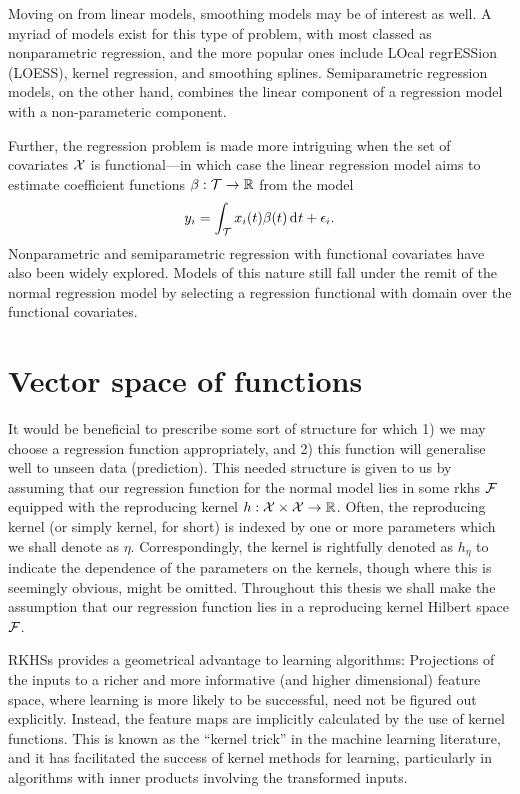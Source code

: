 \documentclass[a4paper,showframe,11pt]{report}
\begin{document}
Moving on from linear models, smoothing models may be of interest as well.
A myriad of models exist for this type of problem, with most classed as nonparametric regression, and the more popular ones include LOcal regrESSion (LOESS), kernel regression, and smoothing splines.
Semiparametric regression models, on the other hand, combines the linear component of a regression model with a non-parameteric component.

Further, the regression problem is made more intriguing when the set of covariates ${\mathcal X}$ is functional---in which case the linear regression model aims to estimate coefficient functions $\beta:{\mathcal T} \to \mathbb{R}$ from the model
\[
  y_i = \int_{\mathcal T} x_i(t)\beta(t) \operatorname{d}\hspace{0.5pt}\! t + \epsilon_i.
\]
Nonparametric and semiparametric regression with functional covariates have also been widely explored.
Models of this nature still fall under the remit of the normal regression model by selecting a regression functional with domain over the functional covariates.

\section{Vector space of functions}

It would be beneficial to prescribe some sort of structure for which 1) we may choose a regression function appropriately, and 2) this function will generalise well to unseen data (prediction). 
This needed structure is given to us by assuming that our regression function for the normal model lies in some \gls*{rkhs} ${\mathcal F}$ equipped with the reproducing kernel $h:{\mathcal X} \times {\mathcal X} \to \mathbb{R}$.
Often, the reproducing kernel (or simply kernel, for short) is indexed by one or more parameters which we shall denote as $\eta$.
Correspondingly, the kernel is rightfully denoted as $h_\eta$ to indicate the dependence of the parameters on the kernels, though where this is seemingly obvious, might be omitted.
Throughout this thesis we shall make the assumption that our regression function lies in a reproducing kernel Hilbert space ${\mathcal F}$.

RKHSs provides a geometrical advantage to learning algorithms: Projections of the inputs to a richer and more informative (and higher dimensional) feature space, where learning is more likely to be successful, need not be figured out explicitly.
Instead, the feature maps are implicitly calculated by the use of kernel functions. 
This is known as the ``kernel trick'' in the machine learning literature, and it has facilitated the success of kernel methods for learning, particularly in algorithms with inner products involving the transformed inputs. 
\end{document}
